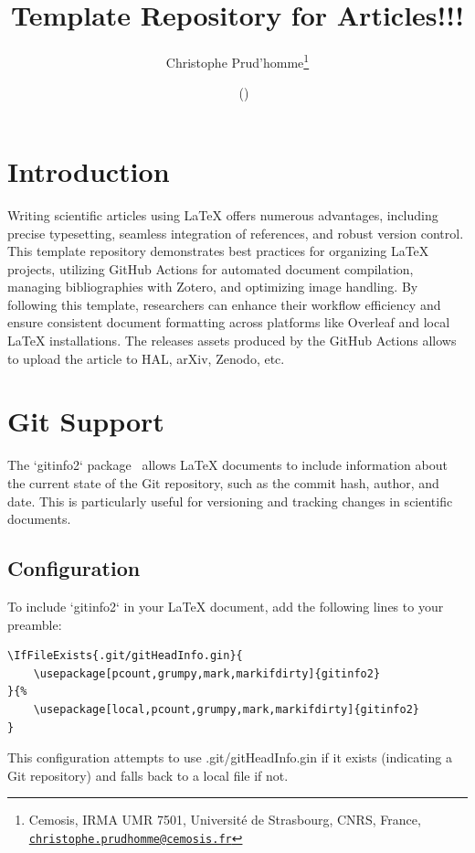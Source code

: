 \documentclass[a4paper]{article}
\title{Template Repository for Articles!!!}
\author{Christophe Prud'homme\thanks{Cemosis, IRMA UMR 7501, Université de Strasbourg, CNRS, France, \tt \href{mailto:christophe.prudhomme@cemosis.fr}{christophe.prudhomme@cemosis.fr}}}
\date{\gitReln\  \gitAuthorDate\ (\gitAbbrevHash)}
\begin{document}
\maketitle
\tableofcontents

\section{Introduction}
\label{sec:introduction}

Writing scientific articles using LaTeX offers numerous advantages, including precise typesetting, seamless integration of references, and robust version control. 
This template repository demonstrates best practices for organizing LaTeX projects, utilizing GitHub Actions for automated document compilation, managing bibliographies with Zotero, and optimizing image handling. 
By following this template, researchers can enhance their workflow efficiency and ensure consistent document formatting across platforms like Overleaf and local LaTeX installations.
The releases assets produced by the GitHub Actions allows to upload the article to HAL, arXiv, Zenodo, etc.



\section{Git Support}
\label{sec:git-support}

The `gitinfo2` package~\citep{brent_longborough_gitinfo2sty_2015} allows LaTeX documents to include information about the current state of the Git repository, such as the commit hash, author, and date. This is particularly useful for versioning and tracking changes in scientific documents.

\subsection{Configuration}

To include `gitinfo2` in your LaTeX document, add the following lines to your preamble:

\begin{verbatim}
\IfFileExists{.git/gitHeadInfo.gin}{
    \usepackage[pcount,grumpy,mark,markifdirty]{gitinfo2}
}{%
    \usepackage[local,pcount,grumpy,mark,markifdirty]{gitinfo2}
}
\end{verbatim}

This configuration attempts to use .git/gitHeadInfo.gin if it exists (indicating a Git repository) and falls back to a local file if not.
\end{document}
